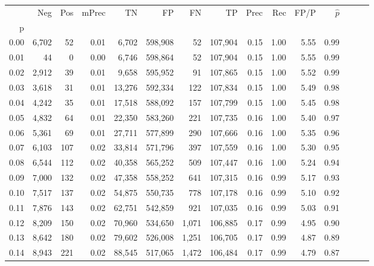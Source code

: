 \begin{tabular}{rrrrrrrrrrrrrrr}
\toprule
{} &     Neg &    Pos & mPrec &       TN &       FP &       FN &       TP &  Prec &   Rec &  FP/P & $\hat{p}$ \\
p    &         &        &       &          &          &          &          &       &       &       &           \\
\midrule
0.00 &   6,702 &     52 &  0.01 &    6,702 &  598,908 &       52 &  107,904 &  0.15 &  1.00 &  5.55 &      0.99 \\
0.01 &      44 &      0 &  0.00 &    6,746 &  598,864 &       52 &  107,904 &  0.15 &  1.00 &  5.55 &      0.99 \\
0.02 &   2,912 &     39 &  0.01 &    9,658 &  595,952 &       91 &  107,865 &  0.15 &  1.00 &  5.52 &      0.99 \\
0.03 &   3,618 &     31 &  0.01 &   13,276 &  592,334 &      122 &  107,834 &  0.15 &  1.00 &  5.49 &      0.98 \\
0.04 &   4,242 &     35 &  0.01 &   17,518 &  588,092 &      157 &  107,799 &  0.15 &  1.00 &  5.45 &      0.98 \\
0.05 &   4,832 &     64 &  0.01 &   22,350 &  583,260 &      221 &  107,735 &  0.16 &  1.00 &  5.40 &      0.97 \\
0.06 &   5,361 &     69 &  0.01 &   27,711 &  577,899 &      290 &  107,666 &  0.16 &  1.00 &  5.35 &      0.96 \\
0.07 &   6,103 &    107 &  0.02 &   33,814 &  571,796 &      397 &  107,559 &  0.16 &  1.00 &  5.30 &      0.95 \\
0.08 &   6,544 &    112 &  0.02 &   40,358 &  565,252 &      509 &  107,447 &  0.16 &  1.00 &  5.24 &      0.94 \\
0.09 &   7,000 &    132 &  0.02 &   47,358 &  558,252 &      641 &  107,315 &  0.16 &  0.99 &  5.17 &      0.93 \\
0.10 &   7,517 &    137 &  0.02 &   54,875 &  550,735 &      778 &  107,178 &  0.16 &  0.99 &  5.10 &      0.92 \\
0.11 &   7,876 &    143 &  0.02 &   62,751 &  542,859 &      921 &  107,035 &  0.16 &  0.99 &  5.03 &      0.91 \\
0.12 &   8,209 &    150 &  0.02 &   70,960 &  534,650 &    1,071 &  106,885 &  0.17 &  0.99 &  4.95 &      0.90 \\
0.13 &   8,642 &    180 &  0.02 &   79,602 &  526,008 &    1,251 &  106,705 &  0.17 &  0.99 &  4.87 &      0.89 \\
0.14 &   8,943 &    221 &  0.02 &   88,545 &  517,065 &    1,472 &  106,484 &  0.17 &  0.99 &  4.79 &      0.87 \\

\end{tabular}
